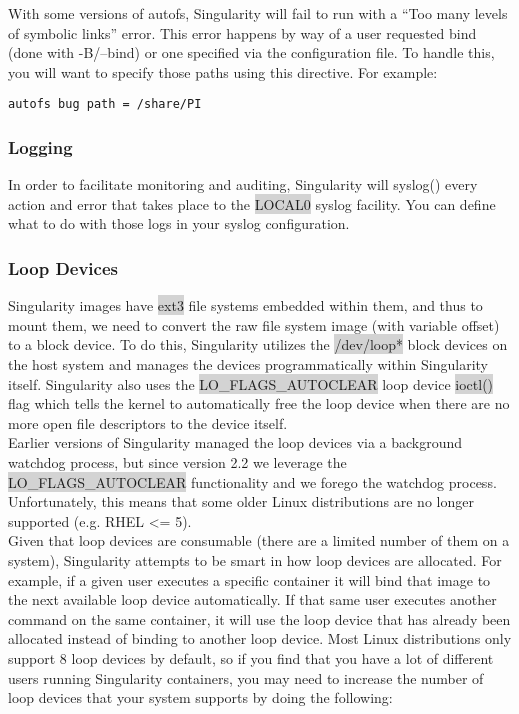 \documentclass[a4paper]{article}
\newcounter{subsubsubsection}[subsubsection]
\begin{document}

With some versions of autofs, Singularity will fail to run with a “Too many levels of symbolic links” error. This error happens by way of a user requested bind (done with -B/–bind) or one specified via the configuration file. To handle this, you will want to specify those paths using this directive. For example:\\[0.1in]
\begin{lstlisting}[frame=single]
autofs bug path = /share/PI
\end{lstlisting}


\subsubsection{Logging}

In order to facilitate monitoring and auditing, Singularity will syslog() every action and error that takes place to the \colorbox{lightgray}{LOCAL0} syslog facility. You can define what to do with those logs in your syslog configuration.



\subsubsection{Loop Devices}

Singularity images have  \colorbox{lightgray}{ext3} file systems embedded within them, and thus to mount them, we need to convert the raw file system image (with variable offset) to a block device. To do this, Singularity utilizes the  \colorbox{lightgray}{/dev/loop*} block devices on the host system and manages the devices programmatically within Singularity itself. Singularity also uses the  \colorbox{lightgray}{LO\_FLAGS\_AUTOCLEAR} loop device  \colorbox{lightgray}{ioctl()} flag which tells the kernel to automatically free the loop device when there are no more open file descriptors to the device itself.\\[0.1in]

Earlier versions of Singularity managed the loop devices via a background watchdog process, but since version 2.2 we leverage the  \colorbox{lightgray}{LO\_FLAGS\_AUTOCLEAR} functionality and we forego the watchdog process. Unfortunately, this means that some older Linux distributions are no longer supported (e.g. RHEL <= 5).\\[0.1in]

Given that loop devices are consumable (there are a limited number of them on a system), Singularity attempts to be smart in how loop devices are allocated. For example, if a given user executes a specific container it will bind that image to the next available loop device automatically. If that same user executes another command on the same container, it will use the loop device that has already been allocated instead of binding to another loop device. Most Linux distributions only support 8 loop devices by default, so if you find that you have a lot of different users running Singularity containers, you may need to increase the number of loop devices that your system supports by doing the following:\\[0.1in]
\end{document}
